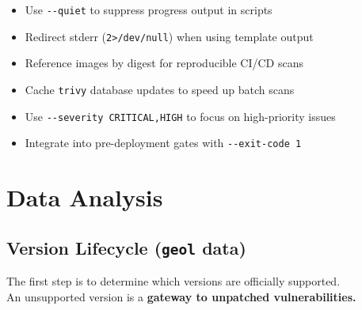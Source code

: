 \documentclass[11pt, a4paper]{article}
\begin{document}
\begin{tcolorbox}[colback=lightgreen!20, colframe=gantt-supported, title=💡 Best Practices for Vulnerability Scanning, fonttitle=\bfseries]
\begin{itemize}
    \item Use \texttt{-{}-quiet} to suppress progress output in scripts
    \item Redirect stderr (\texttt{2>/dev/null}) when using template output
    \item Reference images by digest for reproducible CI/CD scans
    \item Cache \texttt{trivy} database updates to speed up batch scans
    \item Use \texttt{-{}-severity CRITICAL,HIGH} to focus on high-priority issues
    \item Integrate into pre-deployment gates with \texttt{-{}-exit-code 1}
\end{itemize}
\end{tcolorbox}

\newpage

\section{Data Analysis}

\subsection{Version Lifecycle (\texttt{geol} data)}

The first step is to determine which versions are officially supported.\\

An unsupported version is a \textbf{gateway to unpatched vulnerabilities.}
\end{document}
